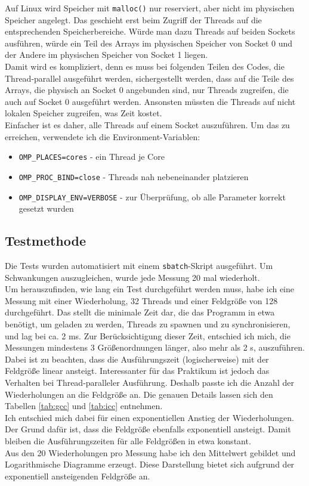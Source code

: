 \documentclass[german,plainarticle,hyperref,utf8]{zihpub}
\begin{document}
	Auf Linux wird Speicher mit \texttt{malloc()} nur reserviert, aber nicht im physischen Speicher angelegt. Das geschieht erst beim Zugriff der Threads auf die entsprechenden Speicherbereiche. Würde man dazu Threads auf beiden Sockets ausführen, würde ein Teil des Arrays im physischen Speicher von Socket 0 und der Andere im physischen Speicher von Socket 1 liegen.\\
	Damit wird es kompliziert, denn es muss bei folgenden Teilen des Codes, die Thread-parallel ausgeführt werden, sichergestellt werden, dass auf die Teile des Arrays, die physisch an Socket 0 angebunden sind, nur Threads zugreifen, die auch auf Socket 0 ausgeführt werden. Ansonsten müssten die Threads auf nicht lokalen Speicher zugreifen, was Zeit kostet.\\
	Einfacher ist es daher, alle Threads auf einem Socket auszuführen. Um das zu erreichen, verwendete ich die Environment-Variablen:
	\begin{itemize}
		\item \texttt{OMP\_PLACES=cores} - ein Thread je Core
		\item \texttt{OMP\_PROC\_BIND=close} - Threads nah nebeneinander platzieren
		\item \texttt{OMP\_DISPLAY\_ENV=VERBOSE} - zur Überprüfung, ob alle Parameter korrekt gesetzt wurden
	\end{itemize}	
	\subsection{Testmethode}
	Die Tests wurden automatisiert mit einem \texttt{sbatch}-Skript ausgeführt. Um Schwankungen auszugleichen, wurde jede Messung 20 mal wiederholt.\\
	Um herauszufinden, wie lang ein Test durchgeführt werden muss, habe ich eine Messung mit einer Wiederholung, 32 Threads und einer Feldgröße von 128 durchgeführt. Das stellt die minimale Zeit dar, die das Programm in etwa benötigt, um geladen zu werden, Threads zu spawnen und zu synchronisieren, und lag bei ca. 2 ms. Zur Berücksichtigung dieser Zeit, entschied ich mich, die Messungen mindestens 3 Größenordnungen länger, also mehr als 2 s, auszuführen.\\
	Dabei ist zu beachten, dass die Ausführungszeit (logischerweise) mit der Feldgröße linear ansteigt. Interessanter für das Praktikum ist jedoch das Verhalten bei Thread-paralleler Ausführung. Deshalb passte ich die Anzahl der Wiederholungen an die Feldgröße an. Die genauen Details lassen sich den Tabellen \ref{tab:gcc} und
	\ref{tab:icc} entnehmen.\\
	Ich entschied mich dabei für einen exponentiellen Anstieg der Wiederholungen. Der Grund dafür ist, dass die Feldgröße ebenfalls exponentiell ansteigt. Damit bleiben die Ausführungszeiten für alle Feldgrößen in etwa konstant.\\
	Aus den 20 Wiederholungen pro Messung habe ich den Mittelwert gebildet und Logarithmische Diagramme erzeugt. Diese Darstellung bietet sich aufgrund der exponentiell ansteigenden Feldgröße an.\\
	
\end{document}
